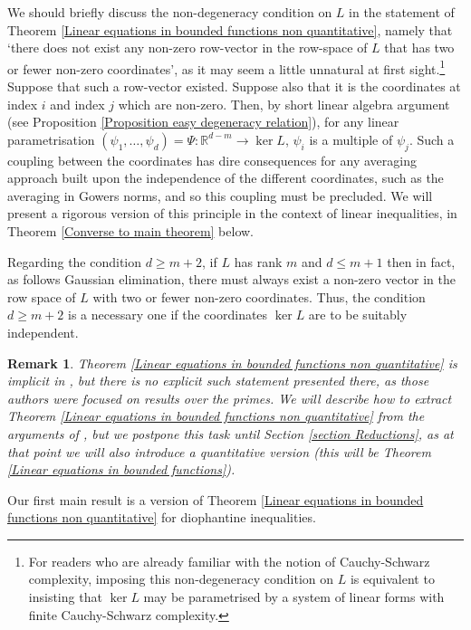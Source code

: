 \documentclass[12pt,a4paper,twoside,reqno]{amsart}
\newtheorem{Remark}[Theorem]{Remark}
\numberwithin{equation}{section}
\begin{document}
We should briefly discuss the non-degeneracy condition on $L$ in the statement of Theorem \ref{Linear equations in bounded functions non quantitative}, namely that `there does not exist any non-zero row-vector in the row-space of $L$ that has two or fewer non-zero coordinates', as it may seem a little unnatural at first sight.\footnote{For readers who are already familiar with the notion of Cauchy-Schwarz complexity, imposing this non-degeneracy condition on $L$ is equivalent to insisting that $\ker L$ may be parametrised by a system of linear forms with finite Cauchy-Schwarz complexity.} Suppose that such a row-vector existed. Suppose also that it is the coordinates at index $i$ and index $j$ which are non-zero. Then, by short linear algebra argument (see Proposition \ref{Proposition easy degeneracy relation}), for any linear parametrisation $(\psi_1,\dots, \psi_d) = \Psi: \mathbb{R}^{d-m} \longrightarrow \ker L$,  $\psi_i$ is a multiple of $\psi_j$. Such a coupling between the coordinates has dire consequences for any averaging approach built upon the independence of the different coordinates, such as the averaging in Gowers norms, and so this coupling must be precluded. We will present a rigorous version of this principle in the context of linear inequalities, in Theorem \ref{Converse to main theorem} below.

Regarding the condition $d \geqslant m+2$, if $L$ has rank $m$ and $d \leqslant m+1$ then in fact, as follows Gaussian elimination, there must always exist a non-zero vector in the row space of $L$ with two or fewer non-zero coordinates. Thus, the condition $d \geqslant m+2$ is a necessary one if the coordinates $\ker L$ are to be suitably independent.

\begin{Remark}
\emph{Theorem \ref{Linear equations in bounded functions non quantitative} is implicit in \cite{GT10}, but there is no explicit such statement presented there, as those authors were focused on results over the primes. We will describe how to extract Theorem \ref{Linear equations in bounded functions non quantitative} from the arguments of \cite{GT10}, but we postpone this task until Section \ref{section Reductions}, as at that point we will also introduce a quantitative version (this will be Theorem \ref{Linear equations in bounded functions}).}
\end{Remark}

Our first main result is a version of Theorem \ref{Linear equations in bounded functions non quantitative} for diophantine inequalities. 
\end{document}
